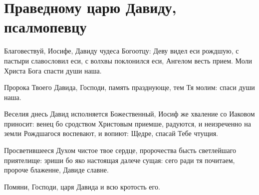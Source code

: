 \mychapterending


\section{Праведному царю Давиду, псалмопевцу}\begin{mymulticols}


Благовествуй, Иосифе, Давиду чудеса Богоотцу: Деву видел еси рождшую, с пастыри славословил еси, с волхвы поклонился еси, Ангелом весть прием. Моли Христа Бога спасти души наша.


Пророка Твоего Давида, Господи, память празднующе, тем Тя молим: спаси души наша.


Веселия днесь Давид исполняется Божественный, Иосиф же хваление со Иаковом приносит: венец бо сродством Христовым приемше, радуются, и неизреченно на земли Рождшагося воспевают, и вопиют: Щедре, спасай Тебе чтущия.


Просветившееся Духом чистое твое сердце, пророчества бысть светлейшаго приятелище: зриши бо яко настоящая далече сущая: сего ради тя почитаем, пророче блаженне, Давиде славне.


Помяни, Господи, царя Давида и всю кротость его.



\end{mymulticols}
